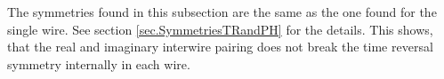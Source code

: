 The symmetries found in this subsection are the same as the one found for the single wire. See section \ref{sec.SymmetriesTRandPH} for the details. This shows, that the real and imaginary interwire pairing does not break the time reversal symmetry internally in each wire.

